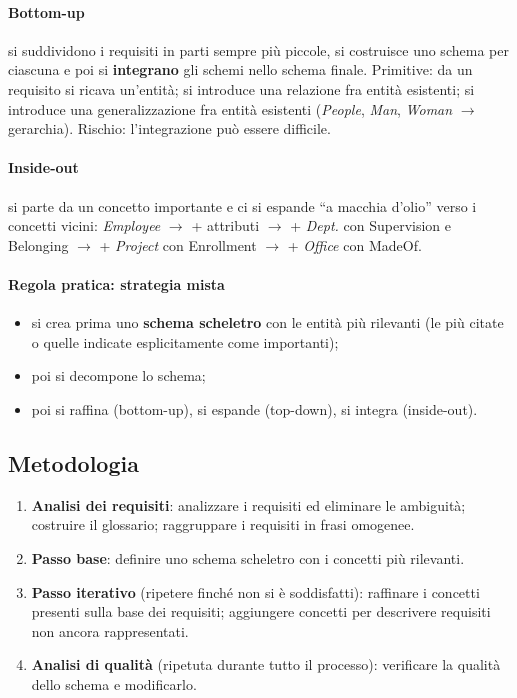 \documentclass[a4paper,12pt]{article}
\begin{document}
\paragraph{Bottom-up} si suddividono i requisiti in parti sempre più piccole,
si costruisce uno schema per ciascuna e poi si \textbf{integrano} gli schemi
nello schema finale. Primitive: da un requisito si ricava un'entità; si
introduce una relazione fra entità esistenti; si introduce una
generalizzazione fra entità esistenti (\emph{People}, \emph{Man},
\emph{Woman} $\to$ gerarchia). Rischio: l'integrazione può essere difficile.

\paragraph{Inside-out} si parte da un concetto importante e ci si espande ``a
macchia d'olio'' verso i concetti vicini: \emph{Employee} $\to$ + attributi
$\to$ + \emph{Dept.} con Supervision e Belonging $\to$ + \emph{Project} con
Enrollment $\to$ + \emph{Office} con MadeOf.

\paragraph{Regola pratica: strategia mista}
\begin{itemize}
  \item si crea prima uno \textbf{schema scheletro} con le entità più
    rilevanti (le più citate o quelle indicate esplicitamente come
    importanti);
  \item poi si decompone lo schema;
  \item poi si raffina (bottom-up), si espande (top-down), si integra
    (inside-out).
\end{itemize}

\subsection{Metodologia}

\begin{enumerate}
  \item \textbf{Analisi dei requisiti}: analizzare i requisiti ed eliminare le
    ambiguità; costruire il glossario; raggruppare i requisiti in frasi
    omogenee.
  \item \textbf{Passo base}: definire uno schema scheletro con i concetti più
    rilevanti.
  \item \textbf{Passo iterativo} (ripetere finché non si è soddisfatti):
    raffinare i concetti presenti sulla base dei requisiti; aggiungere
    concetti per descrivere requisiti non ancora rappresentati.
  \item \textbf{Analisi di qualità} (ripetuta durante tutto il processo):
    verificare la qualità dello schema e modificarlo.
\end{enumerate}
\end{document}
